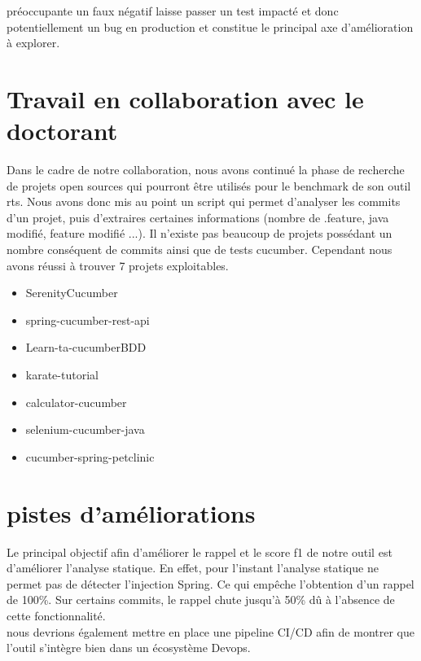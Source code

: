 \documentclass[12pt,a4paper]{article}
\begin{document}
  préoccupante un faux négatif laisse passer un test impacté et donc                                                                                                                                                   
  potentiellement un bug en production et constitue le principal axe                                                                                                                                                   
  d'amélioration à explorer.                                                                                                                                                                                          
  \section{Travail en collaboration avec le doctorant}
  Dans le cadre de notre collaboration, nous avons continué la phase de recherche de projets open sources qui pourront être utilisés pour le benchmark de son outil rts. Nous avons donc mis au point un script qui permet d'analyser les commits d'un projet, puis d'extraires certaines informations (nombre de .feature, java modifié, feature modifié ...).
  Il n'existe pas beaucoup de projets possédant un nombre conséquent de commits ainsi que de tests cucumber.
  Cependant nous avons réussi à trouver 7 projets exploitables.
  \begin{itemize}
      \item SerenityCucumber
      \item spring-cucumber-rest-api
      \item Learn-ta-cucumberBDD
      \item karate-tutorial
      \item calculator-cucumber
      \item selenium-cucumber-java
      \item cucumber-spring-petclinic
  \end{itemize}

\section{pistes d'améliorations}
Le principal objectif afin d'améliorer le rappel et le score f1 de notre outil est d'améliorer l'analyse statique. En effet, pour l'instant l'analyse statique ne permet pas de détecter l'injection Spring. Ce qui empêche l'obtention d'un rappel de 100\%. Sur certains commits, le rappel chute jusqu'à 50\% dû à l'absence de cette fonctionnalité.\\
nous devrions également mettre en place une pipeline CI/CD afin de montrer que l'outil s'intègre bien dans un écosystème Devops.
\end{document}
